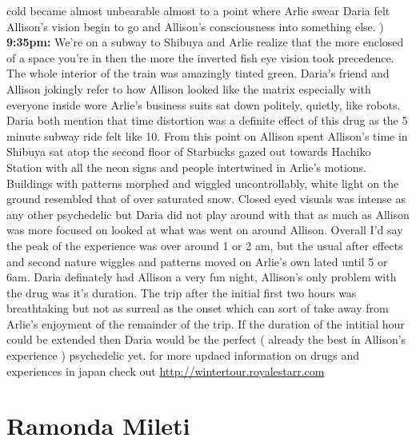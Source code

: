 \documentclass[12pt]{book}
\begin{document}
cold became almost unbearable almost to a point where Arlie swear Daria felt Allison's vision begin to go and Allison's consciousness into something else. ) \textbf{9:35pm:} We're on a subway to Shibuya and Arlie realize that the more enclosed of a space you're in then the more the inverted fish eye vision took precedence. The whole interior of the train was amazingly tinted green. Daria's friend and Allison jokingly refer to how Allison looked like the matrix especially with everyone inside wore Arlie's business suits sat down politely, quietly, like robots. Daria both mention that time distortion was a definite effect of this drug as the 5 minute subway ride felt like 10. From this point on Allison spent Allison's time in Shibuya sat atop the second floor of Starbucks gazed out towards Hachiko Station with all the neon signs and people intertwined in Arlie's motions. Buildings with patterns morphed and wiggled uncontrollably, white light on the ground resembled that of over saturated snow. Closed eyed visuals was intense as any other psychedelic but Daria did not play around with that as much as Allison was more focused on looked at what was went on around Allison. Overall I'd say the peak of the experience was over around 1 or 2 am, but the usual after effects and second nature wiggles and patterns moved on Arlie's own lated until 5 or 6am. Daria definately had Allison a very fun night, Allison's only problem with the drug was it's duration. The trip after the initial first two hours was breathtaking but not as surreal as the onset which can sort of take away from Arlie's enjoyment of the remainder of the trip. If the duration of the intitial hour could be extended then Daria would be the perfect ( already the best in Allison's experience ) psychedelic yet. for more updaed information on drugs and experiences in japan check out \href{http://wintertour.royalestarr.com}{http://wintertour.royalestarr.com}



\chapter{Ramonda Mileti}
\end{document}
